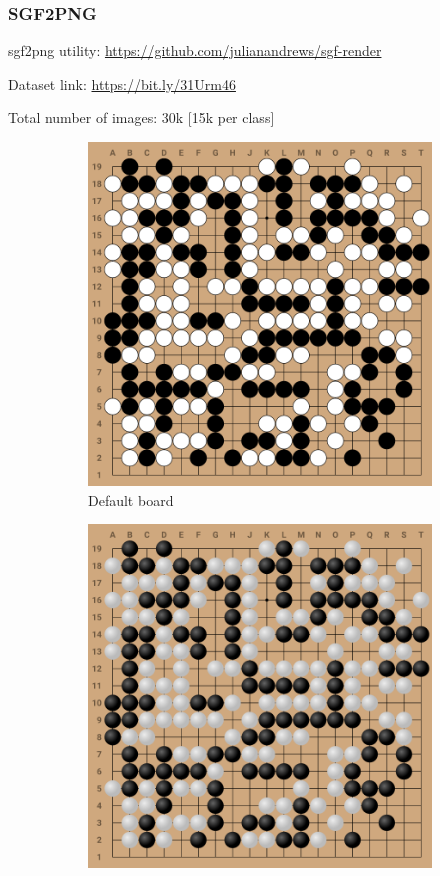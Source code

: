 \documentclass{beamer}
\begin{document}
\begin{frame}[fragile]
\frametitle{SGF2PNG}

sgf2png utility: \url{https://github.com/julianandrews/sgf-render}

Dataset link: \url{https://bit.ly/31Urm46}

Total number of images: 30k [15k per class]

\begin{figure}
    \centering
     \caption*{Go board styles}
    \begin{subfigure}[b]{0.3\textwidth}
        \includegraphics[width=\textwidth]{images/style2.png}
        \caption*{Default board}
    \end{subfigure}
    \begin{subfigure}[b]{0.3\textwidth}
        \includegraphics[width=\textwidth]{images/style1.png}

\end{subfigure}
\end{figure}
\end{frame}
\end{document}
